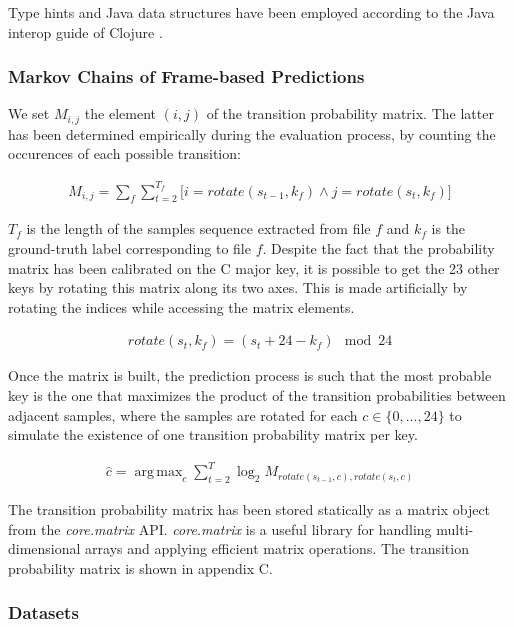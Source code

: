 \documentclass[letterpaper]{article}
\DeclareMathOperator*{\argmax}{arg\,max}
\begin{document}
\FloatBarrier

Type hints and Java data structures have been employed according to the Java interop guide of Clojure \citep{CL}.

\subsubsection{Markov Chains of Frame-based Predictions}
\label{sssec:A}

We set $M_{i, j}$ the element $(i, j)$ of the transition probability matrix. The latter has been determined empirically during the evaluation process, by counting the occurences of each possible transition:

\begin{align}
M_{i, j} = \sum_f \sum_{t=2}^{T_f} \big[ i=rotate(s_{t-1}, k_f) \wedge j=rotate(s_t, k_f) \big]
\label{MIJ}
\end{align}

$T_f$ is the length of the samples sequence extracted from file $f$ and $k_f$ is the ground-truth label corresponding to file $f$.
Despite the fact that the probability matrix has been calibrated on the C major key, it is possible to get the 23 other keys by rotating this matrix along its two axes.
This is made artificially by rotating the indices while accessing the matrix elements.

\begin{align}
rotate(s_t, k_f) = (s_t + 24 - k_f) \mod 24
\label{rotate}
\end{align}


Once the matrix is built, the prediction process is such that the most probable key is the one that maximizes the product of the transition probabilities between adjacent samples, 
where the samples are rotated for each $c \in \{0, ..., 24\}$ to simulate the existence of one transition probability matrix per key.

\begin{align}
\hat{c} = \argmax_c \sum_{t=2}^{T} \log_2 M_{rotate(s_{t-1}, c), rotate(s_{t}, c)}
\label{logprobaclojure}
\end{align}

The transition probability matrix has been stored statically as a matrix object from the \textit{core.matrix} API. \textit{core.matrix} is a useful library for handling multi-dimensional arrays and applying efficient matrix operations. The transition probability matrix is shown in appendix C.

\subsubsection{Datasets}
\end{document}

